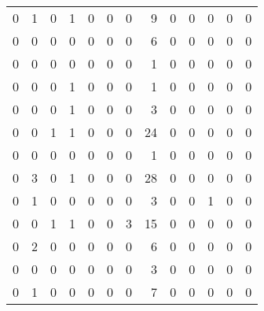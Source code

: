 \begin{tabular}{rrrrrrrrrrrrr}
       0 &       1 &          0 &               1 &                0 &       0 &          0 &          9 &         0 &         0 &      0 &             0 &         0 \\
       0 &       0 &          0 &               0 &                0 &       0 &          0 &          6 &         0 &         0 &      0 &             0 &         0 \\
       0 &       0 &          0 &               0 &                0 &       0 &          0 &          1 &         0 &         0 &      0 &             0 &         0 \\
       0 &       0 &          0 &               1 &                0 &       0 &          0 &          1 &         0 &         0 &      0 &             0 &         0 \\
       0 &       0 &          0 &               1 &                0 &       0 &          0 &          3 &         0 &         0 &      0 &             0 &         0 \\
       0 &       0 &          1 &               1 &                0 &       0 &          0 &         24 &         0 &         0 &      0 &             0 &         0 \\
       0 &       0 &          0 &               0 &                0 &       0 &          0 &          1 &         0 &         0 &      0 &             0 &         0 \\
       0 &       3 &          0 &               1 &                0 &       0 &          0 &         28 &         0 &         0 &      0 &             0 &         0 \\
       0 &       1 &          0 &               0 &                0 &       0 &          0 &          3 &         0 &         0 &      1 &             0 &         0 \\
       0 &       0 &          1 &               1 &                0 &       0 &          3 &         15 &         0 &         0 &      0 &             0 &         0 \\
       0 &       2 &          0 &               0 &                0 &       0 &          0 &          6 &         0 &         0 &      0 &             0 &         0 \\
       0 &       0 &          0 &               0 &                0 &       0 &          0 &          3 &         0 &         0 &      0 &             0 &         0 \\
       0 &       1 &          0 &               0 &                0 &       0 &          0 &          7 &         0 &         0 &      0 &             0 &         0 \\

\end{tabular}
